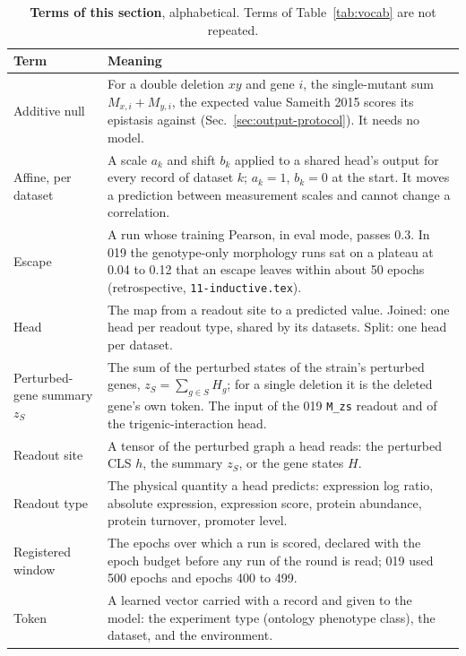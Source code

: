\begin{table}[htbp]
\centering
\footnotesize
\caption[]{\textbf{Terms of this section}, alphabetical. Terms of Table~\ref{tab:vocab}
are not repeated.}
\label{tab:output-vocab}
\begin{tabular}{>{\raggedright\arraybackslash}p{30mm}>{\raggedright\arraybackslash}p{140mm}}
\toprule
Term & Meaning \\
\midrule
Additive null & For a double deletion $xy$ and gene $i$, the single-mutant sum
$M_{x,i} + M_{y,i}$, the expected value Sameith 2015 scores its epistasis against
(Sec.~\ref{sec:output-protocol}). It needs no model. \\
Affine, per dataset & A scale $a_k$ and shift $b_k$ applied to a shared head's output for
every record of dataset $k$; $a_k = 1$, $b_k = 0$ at the start. It moves a prediction
between measurement scales and cannot change a correlation. \\
Escape & A run whose training Pearson, in eval mode, passes 0.3. In 019 the genotype-only
morphology runs sat on a plateau at 0.04 to 0.12 that an escape leaves within about 50
epochs (retrospective, \texttt{11-inductive.tex}). \\
Head & The map from a readout site to a predicted value. Joined: one head per readout
type, shared by its datasets. Split: one head per dataset. \\
Perturbed-gene summary $z_S$ & The sum of the perturbed states of the strain's perturbed
genes, $z_S = \sum_{g \in S} H_g$; for a single deletion it is the deleted gene's own
token. The input of the 019 \texttt{M\_zs} readout and of the trigenic-interaction head. \\
Readout site & A tensor of the perturbed graph a head reads: the perturbed CLS $h$, the
summary $z_S$, or the gene states $H$. \\
Readout type & The physical quantity a head predicts: expression log ratio, absolute
expression, expression score, protein abundance, protein turnover, promoter level. \\
Registered window & The epochs over which a run is scored, declared with the epoch budget
before any run of the round is read; 019 used 500 epochs and epochs 400 to 499. \\
Token & A learned vector carried with a record and given to the model: the experiment type
(ontology phenotype class), the dataset, and the environment. \\
\bottomrule
\end{tabular}
\end{table}

